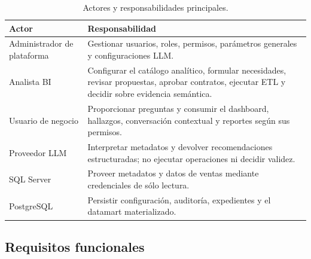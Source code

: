 \documentclass[11pt,letterpaper]{article}
\begin{document}
\begin{table}[ht]
\centering
\caption{Actores y responsabilidades principales.}
\begin{tabularx}{\textwidth}{@{}p{}X@{}}
  \toprule
  Actor & Responsabilidad \\
  \midrule
  Administrador de plataforma & Gestionar usuarios, roles, permisos, parámetros generales y configuraciones LLM. \\
  Analista BI & Configurar el catálogo analítico, formular necesidades, revisar propuestas, aprobar contratos, ejecutar ETL y decidir sobre evidencia semántica. \\
  Usuario de negocio & Proporcionar preguntas y consumir el dashboard, hallazgos, conversación contextual y reportes según sus permisos. \\
  Proveedor LLM & Interpretar metadatos y devolver recomendaciones estructuradas; no ejecutar operaciones ni decidir validez. \\
  SQL Server & Proveer metadatos y datos de ventas mediante credenciales de sólo lectura. \\
  PostgreSQL & Persistir configuración, auditoría, expedientes y el datamart materializado. \\
  \bottomrule
\end{tabularx}
\end{table}

\subsection{Requisitos funcionales}
\end{document}
